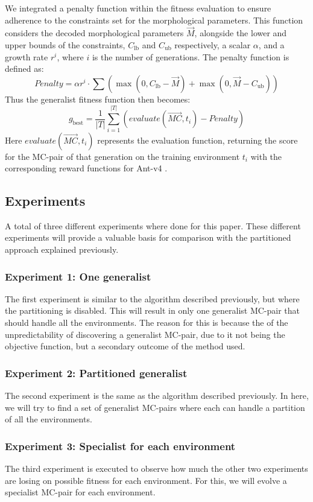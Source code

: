         We integrated a penalty function within the fitness evaluation to ensure adherence to the constraints set for the morphological parameters. This function considers the decoded morphological parameters $\overrightarrow{M}$, alongside the lower and upper bounds of the constraints, $C_\text{lb}$ and $C_\text{ub}$ respectively, a scalar $\alpha$, and a growth rate $r^i$, where $i$ is the number of generations. The penalty function is defined as:
        {\footnotesize
            \begin{equation}
                Penalty = \alpha r^i \cdot \sum(
                    \max(0, C_\text{lb} - \overrightarrow{M}) + 
                    \max(0, \overrightarrow{M} - C_\text{ub})
                )
            \end{equation}
        }
        Thus the generalist fitness function then becomes:
        {\footnotesize
            \begin{equation}
                g_{\text{best}} = \frac{1}{|T|} \sum_{i=1}^{|T|}(
                    evaluate(\overrightarrow{MC}, t_i) - Penalty
                ) 
            \end{equation}
        }
        Here $evaluate(\overrightarrow{MC}, t_i)$ represents the evaluation function, returning the score for the MC-pair of that generation on the training environment $t_i$ with the corresponding reward functions for Ant-v4 \cite{Gymnasium2023}.

    \subsection{Experiments}
        A total of three different experiments where done for this paper. These different experiments will provide a valuable basis for comparison with the partitioned approach explained previously.
        \subsubsection{Experiment 1: One generalist}
            The first experiment is similar to the algorithm described previously, but where the partitioning is disabled. This will result in only one generalist MC-pair that should handle all the environments. The reason for this is because the of the unpredictability of discovering a generalist MC-pair, due to it not being the objective function, but a secondary outcome of the method used.
        \subsubsection{Experiment 2: Partitioned generalist}
            The second experiment is the same as the algorithm described previously. In here, we will try to find a set of generalist MC-pairs where each can handle a partition of all the environments. 
        \subsubsection{Experiment 3: Specialist for each environment}
            The third experiment is executed to observe how much the other two experiments are losing on possible fitness for each environment. For this, we will evolve a specialist MC-pair for each environment.
